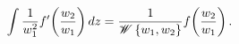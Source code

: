 \[\int\frac{1}{w_{1}^{2}}f^{\prime}\!\left(\frac{w_{2}}{w_{1}}\right)dz=\frac{1}%
{\mathop{\mathscr{W}\/}\nolimits\left\{w_{1},w_{2}\right\}}f\!\left(\frac{w_{2%
}}{w_{1}}\right).\]